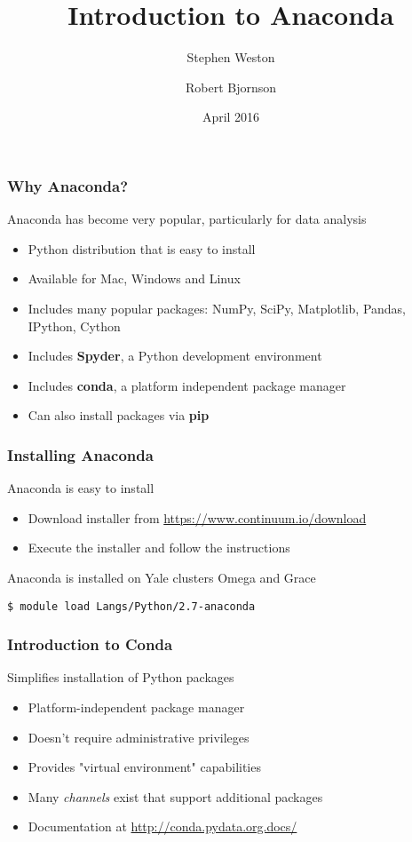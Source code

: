 \documentclass[10pt]{beamer}
\title{Introduction to Anaconda}
\author{{Stephen Weston} \and {Robert Bjornson}}
\institute[Yale]{
  Yale Center for Research Computing \\
  Yale University
}
\date{April 2016}
\begin{document}
\begin{frame}[plain]
  \titlepage
\end{frame}

\begin{frame}
\frametitle{Why Anaconda?}
Anaconda has become very popular, particularly for data analysis
\begin{itemize}
\item Python distribution that is easy to install
\item Available for Mac, Windows and Linux
\item Includes many popular packages:
  NumPy, SciPy, Matplotlib, Pandas, IPython, Cython
\item Includes \textbf{Spyder}, a Python development environment
\item Includes \textbf{conda}, a platform independent package manager
\item Can also install packages via \textbf{pip}
\end{itemize}
\end{frame}

\begin{frame}[fragile]
\frametitle{Installing Anaconda}
Anaconda is easy to install
\begin{itemize}
\item Download installer from \url{https://www.continuum.io/download}
\item Execute the installer and follow the instructions
\end{itemize}
\vskip10pt
Anaconda is installed on Yale clusters Omega and Grace
\begin{verbatim}
$ module load Langs/Python/2.7-anaconda
\end{verbatim}
\end{frame}

\begin{frame}
\frametitle{Introduction to Conda}
Simplifies installation of Python packages
\begin{itemize}
\item Platform-independent package manager
\item Doesn't require administrative privileges
\item Provides "virtual environment" capabilities
\item Many \textit{channels} exist that support additional packages
\item Documentation at \url{http://conda.pydata.org.docs/}
\end{itemize}
\end{frame}
\end{document}
